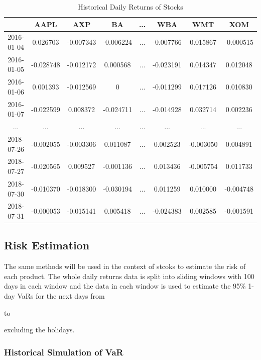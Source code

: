 \documentclass[11pt]{article} %
\theoremstyle{plain}
\theoremstyle{definition}
\begin{document}
{
  \begin{table}[ht]
    \centering
    \scriptsize
    \begin{tabular}{|c|c c c c c c c|}
      \hline
       & AAPL & AXP & BA & ... & WBA & WMT & XOM \\ [0.5ex]
      \hline
      2016-01-04 & 0.026703 & -0.007343 & -0.006224 & ... & -0.007766 & 0.015867 & -0.000515 \\
      \hline
      2016-01-05 & -0.028748 & -0.012172 & 0.000568 & ... & -0.023191 & 0.014347 & 0.012048 \\
      \hline
      2016-01-06 & 0.001393 & -0.012569 & 0 & ... & -0.011299 & 0.017126 & 0.010830 \\
      \hline
      2016-01-07 & -0.022599 & 0.008372 & -0.024711 & ... & -0.014928 & 0.032714 & 0.002236 \\
      \hline
      ... & ... & ... & ... & ... & ... & ... & ... \\
      \hline
      2018-07-26 & -0.002055 & -0.003306 & 0.011087 & ... & 0.002523 & -0.003050 & 0.004891 \\
      \hline
      2018-07-27 & -0.020565 & 0.009527 & -0.001136 & ... & 0.013436 & -0.005754 & 0.011733 \\
      \hline
      2018-07-30 & -0.010370 & -0.018300 & -0.030194 & ... & 0.011259 & 0.010000 & -0.004748 \\
      \hline
      2018-07-31 & -0.000053 & -0.015141 & 0.005418 & ... & -0.024383 & 0.002585 & -0.001591 \\
      \hline
    \end{tabular}
    \caption{Historical Daily Returns of Stocks}
    \label{table:drstock}
  \end{table}
}

\subsection{Risk Estimation}

The same methods will be used in the context of stcoks to estimate the risk of each product. The whole daily returns data is split into sliding windows with 100 days in each window and the data in each window is used to estimate the 95\% 1-day VaRs for the next days from \date{26th May 2016} to \date{31st July 2018} excluding the holidays.

\subsubsection{Historical Simulation of VaR}
\end{document}

